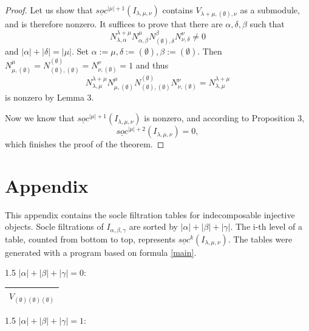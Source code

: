 \documentclass[letterpaper,11pt]{article}
\begin{document}
	\begin{proof}
		Let us show that $\underline{soc}^{|\mu| + 1}(I_{\lambda, \mu, \nu})$ contains $V_{\lambda + \mu, (\emptyset), \nu}$ as a submodule, and is therefore nonzero. It suffices to prove that there are $\alpha, \delta, \beta$ such that 
		\begin{equation*}
			N_{\lambda, \alpha}^{\lambda + \mu} N_{\alpha, \beta}^\mu N_{(\emptyset), \delta}^\beta N_{\nu, \delta}^\nu \not = 0
		\end{equation*}
		and $|\alpha| + |\delta| = |\mu|$. Set $\alpha := \mu, \delta:=(\emptyset), \beta:=(\emptyset)$. Then $N_{\mu, (\emptyset)}^\mu = N_{(\emptyset), (\emptyset)}^{(\emptyset)} = N_{\nu, (\emptyset)}^\nu = 1$ and thus 
		\begin{equation*}
			N_{\lambda, \mu}^{\lambda + \mu} N_{\mu, (\emptyset)}^\mu N_{(\emptyset), (\emptyset)}^{(\emptyset)} N_{\nu, (\emptyset)}^\nu = N_{\lambda, \mu}^{\lambda + \mu}
		\end{equation*}
		is nonzero by Lemma 3.
		
		Now we know that $\underline{soc}^{|\mu| + 1}(I_{\lambda, \mu, \nu})$ is nonzero, and according to Proposition 3,
		\begin{equation*}
			\underline{soc}^{|\mu| + 2}(I_{\lambda, \mu, \nu}) = 0,
		\end{equation*}
		which finishes the proof of the theorem.
	\end{proof}
	\section{Appendix}
	This appendix contains the socle filtration tables for indecomposable injective objects. Socle filtrations of $I_{\alpha, \beta, \gamma}$ are sorted by $|\alpha| + |\beta| + |\gamma|$. The i-th level of a table, counted from bottom to top, represents $\underline{soc}^k(I_{\lambda, \mu, \nu})$. The tables were generated with a program based on formula \eqref{main}.
		
	\begin{spacing}{1.5}
		$|\alpha| + |\beta| + |\gamma|=0$:
	\end{spacing}
	
	\begin{tabular}{| c |}
		\hline
		$V_{(\emptyset)(\emptyset)(\emptyset)}$\\
		\hline
	\end{tabular}
	
	\begin{spacing}{1.5}
		$|\alpha| + |\beta| + |\gamma|=1$:
	\end{spacing}
\end{document}
